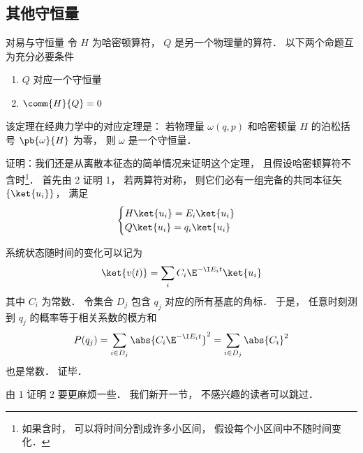 \subsection{其他守恒量}


\begin{theorem}{对易与守恒量}
令 $H$ 为哈密顿算符， $Q$ 是另一个物理量的算符． 以下两个命题互为充分必要条件
\begin{enumerate}
\item $Q$ 对应一个守恒量
\item $\comm{H}{Q} = 0$
\end{enumerate}
\end{theorem}

该定理在经典力学中的对应定理是： 若物理量 $\omega(q, p)$ 和哈密顿量 $H$ 的泊松括号 $\pb{\omega}{H}$ 为零， 则 $\omega$ 是一个守恒量．

证明：我们还是从离散本征态的简单情况来证明这个定理， 且假设哈密顿算符不含时\footnote{如果含时， 可以将时间分割成许多小区间， 假设每个小区间中不随时间变化．}． 首先由 2 证明 1， 若两算符对称， 则它们必有一组完备的共同本征矢 $\{\ket{u_i}\}$， 满足
\begin{equation}
\begin{cases}
H \ket{u_i} = E_i \ket{u_i}\\
Q \ket{u_i} = q_i \ket{u_i}
\end{cases}
\end{equation}

系统状态随时间的变化可以记为
\begin{equation}
\ket{v(t)} = \sum_i C_i \E^{-\I E_i t} \ket{u_i}
\end{equation}
其中 $C_i$ 为常数． 令集合 $D_j$ 包含 $q_j$ 对应的所有基底的角标． 于是， 任意时刻测到 $q_j$ 的概率等于相关系数的模方和
\begin{equation}
P(q_j) = \sum_{i \in D_j} \abs{C_i \E^{-\I E_i t}}^2 = \sum_{i \in D_j} \abs{C_i}^2
\end{equation}
也是常数． 证毕．

由 1 证明 2 要更麻烦一些． 我们新开一节， 不感兴趣的读者可以跳过．

